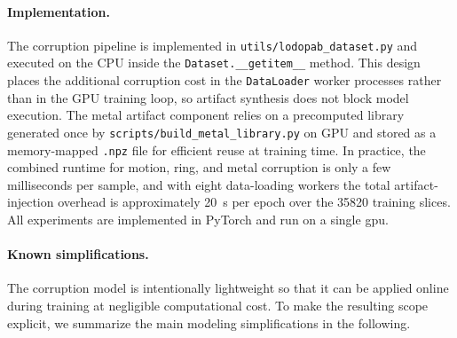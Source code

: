 \paragraph{Implementation.}
The corruption pipeline is implemented in \texttt{utils/lodopab\_dataset.py} and executed on the CPU inside the \texttt{Dataset.\_\_getitem\_\_} method. This design places the additional corruption cost in the \texttt{DataLoader} worker processes rather than in the GPU training loop, so artifact synthesis does not block model execution. The metal artifact component relies on a precomputed library generated once by \texttt{scripts/build\_metal\_library.py} on GPU and stored as a memory-mapped \texttt{.npz} file for efficient reuse at training time. In practice, the combined runtime for motion, ring, and metal corruption is only a few milliseconds per sample, and with eight data-loading workers the total artifact-injection overhead is approximately \SI{20}{\second} per epoch over the \num{35820} training slices. All experiments are implemented in PyTorch and run on a single \gls{gpu}.

\paragraph{Known simplifications.}
The corruption model is intentionally lightweight so that it can be applied online during training at negligible computational cost. To make the resulting scope explicit, we summarize the main modeling simplifications in the following.

